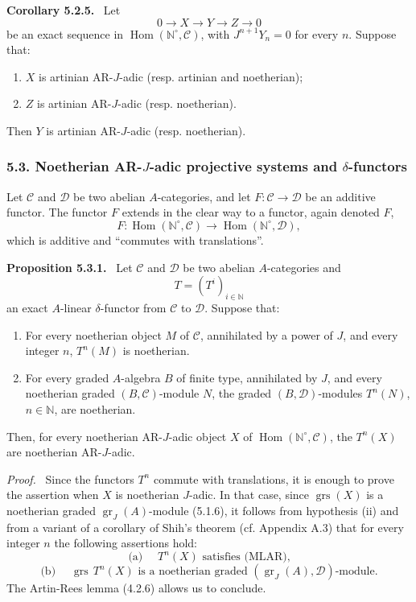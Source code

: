 \documentclass[11pt]{article}
\newenvironment{statement}[1]{\par\medskip\noindent\textbf{#1.}\ }{\par\medskip}
\newenvironment{prooftext}[1][Proof]{\par\noindent\emph{#1.}\ }{\par\medskip}
\DeclareMathOperator{\Hom}{Hom}
\providecommand{\gr}{\operatorname{gr}}
\providecommand{\Hom}{\operatorname{Hom}}
\providecommand{\gr}{\operatorname{gr}}
\providecommand{\gr}{\operatorname{gr}}
\providecommand{\grs}{\operatorname{grs}}
\begin{document}
\begin{statement}{Corollary 5.2.5}
Let
\[
0\longrightarrow X\longrightarrow Y\longrightarrow Z\longrightarrow0
\]
be an exact sequence in \(\Hom(\mathbb N^\circ,\mathcal C)\), with \(J^{n+1}Y_n=0\) for every \(n\). Suppose that:
\begin{enumerate}[label=\textup{(\roman*)}]
\item \(X\) is artinian AR-\(J\)-adic (resp. artinian and noetherian);
\item \(Z\) is artinian AR-\(J\)-adic (resp. noetherian).
\end{enumerate}
Then \(Y\) is artinian AR-\(J\)-adic (resp. noetherian).
\end{statement}

\subsubsection*{5.3. Noetherian AR-\(J\)-adic projective systems and \(\delta\)-functors}

Let \(\mathcal C\) and \(\mathcal D\) be two abelian \(A\)-categories, and let \(F:\mathcal C\to\mathcal D\) be an additive functor. The functor \(F\) extends in the clear way to a functor, again denoted \(F\),
\[
F:\Hom(\mathbb N^\circ,\mathcal C)\longrightarrow\Hom(\mathbb N^\circ,\mathcal D),
\]
which is additive and “commutes with translations”.

\begin{statement}{Proposition 5.3.1}
Let \(\mathcal C\) and \(\mathcal D\) be two abelian \(A\)-categories and
\[
T=(T^i)_{i\in\mathbb N}
\]
an exact \(A\)-linear \(\delta\)-functor from \(\mathcal C\) to \(\mathcal D\). Suppose that:
\begin{enumerate}[label=\textup{(\roman*)}]
\item For every noetherian object \(M\) of \(\mathcal C\), annihilated by a power of \(J\), and every integer \(n\), \(T^n(M)\) is noetherian.
\item For every graded \(A\)-algebra \(B\) of finite type, annihilated by \(J\), and every noetherian graded \((B,\mathcal C)\)-module \(N\), the graded \((B,\mathcal D)\)-modules \(T^n(N)\), \(n\in\mathbb N\), are noetherian.
\end{enumerate}
Then, for every noetherian AR-\(J\)-adic object \(X\) of \(\Hom(\mathbb N^\circ,\mathcal C)\), the \(T^n(X)\) are noetherian AR-\(J\)-adic.
\end{statement}

\begin{prooftext}
Since the functors \(T^n\) commute with translations, it is enough to prove the assertion when \(X\) is noetherian \(J\)-adic. In that case, since \(\grs(X)\) is a noetherian graded \(\gr_J(A)\)-module (5.1.6), it follows from hypothesis (ii) and from a variant of a corollary of Shih's theorem (cf. Appendix A.3) that for every integer \(n\) the following assertions hold:
\[
\text{(a) }\quad T^n(X)\text{ satisfies (MLAR),}
\]
\[
\text{(b) }\quad \grs\,T^n(X)\text{ is a noetherian graded }(\gr_J(A),\mathcal D)\text{-module.}
\]
The Artin-Rees lemma (4.2.6) allows us to conclude.
\end{prooftext}
\end{document}
